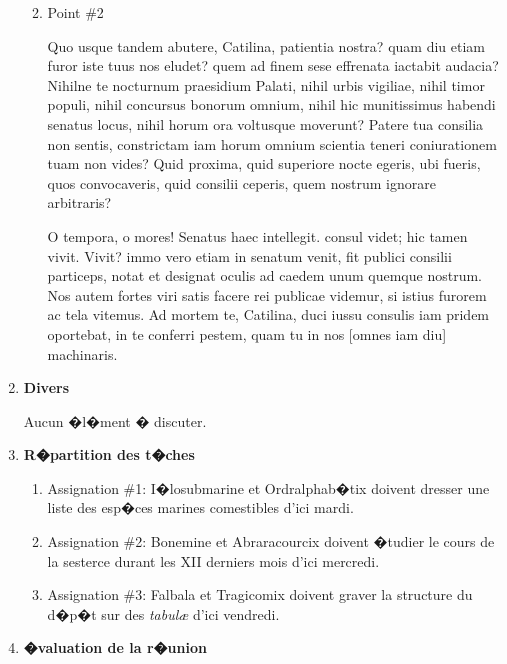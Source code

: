 \documentclass[12pt]{ULojpv}
\begin{document}
\begin{enumerate}
\begin{enumerate}
\begin{enumerate}
\end{enumerate}

\item Point \#2

Quo usque tandem abutere, Catilina, patientia nostra? quam diu etiam furor iste tuus nos eludet? quem ad finem sese effrenata iactabit audacia? Nihilne te nocturnum praesidium Palati, nihil urbis vigiliae, nihil timor populi, nihil concursus bonorum omnium, nihil hic munitissimus habendi senatus locus, nihil horum ora voltusque moverunt? Patere tua consilia non sentis, constrictam iam horum omnium scientia teneri coniurationem tuam non vides? Quid proxima, quid superiore nocte egeris, ubi fueris, quos convocaveris, quid consilii ceperis, quem nostrum ignorare arbitraris?

O tempora, o mores! Senatus haec intellegit. consul videt; hic tamen vivit. Vivit? immo vero etiam in senatum venit, fit publici consilii particeps, notat et designat oculis ad caedem unum quemque nostrum. Nos autem fortes viri satis facere rei publicae videmur, si istius furorem ac tela vitemus. Ad mortem te, Catilina, duci iussu consulis iam pridem oportebat, in te conferri pestem, quam tu in nos [omnes iam diu] machinaris.

\end{enumerate}


\item \textbf{Divers}

Aucun �l�ment � discuter.


\item \textbf{R�partition des t�ches}

\begin{enumerate}

\item Assignation \#1: I�losubmarine et Ordralphab�tix doivent dresser une liste des esp�ces marines comestibles d'ici mardi.

\item Assignation \#2: Bonemine et Abraracourcix doivent �tudier le cours de la sesterce durant les XII derniers mois d'ici mercredi.

\item Assignation \#3: Falbala et Tragicomix doivent graver la structure du d�p�t  sur des \emph{tabul\ae{}} d'ici vendredi.

\end{enumerate}


\item \textbf{�valuation de la r�union}


\end{enumerate}
\end{document}
